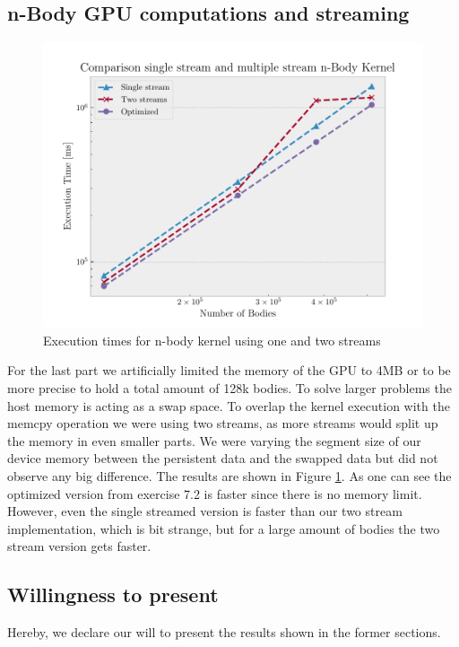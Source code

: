 \documentclass[12pt]{article}
\begin{document}
\subsection{n-Body GPU computations and streaming}

\begin{figure}[H]
	\centering
	\includegraphics[width=0.9\linewidth]{./plot/streams.pdf}
	\caption{Execution times for n-body kernel using one and two streams}%
	\label{fig:streams}
\end{figure}

For the last part we artificially limited the memory of the GPU to 4MB or to be more precise to hold a total amount of 128k bodies. To solve larger problems the host memory is acting as a swap space. To overlap the kernel execution with the memcpy operation we were using two streams, as more streams would split up the memory in even smaller parts. We were varying the segment size of our device memory between the persistent data and the swapped data but did not observe any big difference. The results are shown in Figure \ref{fig:streams}. As one can see the optimized version from exercise 7.2 is faster since there is no memory limit. However, even the single streamed version is faster than our two stream implementation, which is bit strange, but for a large amount of bodies the two stream version gets faster.

\subsection{Willingness to present}
Hereby, we declare our will to present the results shown in the former sections.
\end{document}
